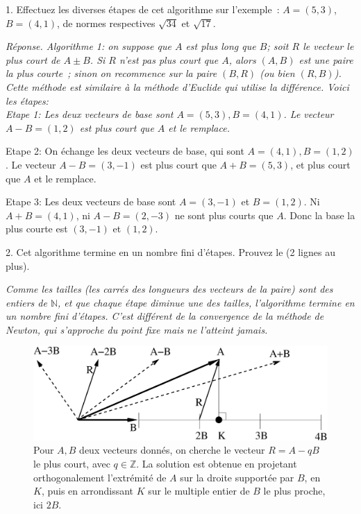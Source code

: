 \documentclass[11pt]{article}
\def\N{\mathbb N}
\def\Z{\mathbb Z}
\begin{document}
{1. Effectuez  les diverses étapes de cet algorithme sur l'exemple~:
$A=(5, 3)$, $B=(4,1)$, de normes respectives $\sqrt{34}$ et $\sqrt{17}$.


{
\ifcorrige

\medskip

{\it Réponse.
Algorithme 1: on suppose que $A$ est plus long que $B$;  soit $R$ le vecteur le plus court de  $A \pm B$. Si $R$ n'est pas plus court que $A$, alors $(A, B)$ est une paire la plus courte~; sinon on recommence sur la paire $(B, R)$ (ou bien $(R, B)$). 
Cette méthode est similaire à la méthode d'Euclide qui utilise la différence.
Voici les étapes:  \\

Etape 1: Les deux vecteurs de base sont $A=(5, 3), B=(4, 1)$. Le vecteur $A-B= (1, 2)$ est plus court que $A$ et le remplace. 

Etape 2: On échange les deux vecteurs de base, qui sont $A=(4, 1), B=(1, 2)$. Le vecteur  $A-B=(3, -1)$
est plus court que $A+B=(5, 3)$, et plus court que $A$ et le remplace.

Etape 3: Les deux vecteurs de base sont $A=(3,-1)$ et $B=(1, 2)$. Ni $A+B=(4,1)$, ni $A-B=(2, -3)$ ne sont plus courts que $A$. Donc la base la plus courte est $(3,-1)$ et $(1, 2)$.


\else
\fi

\medskip

}
}

{
2. Cet algorithme termine en un nombre fini d'étapes. Prouvez le (2 lignes au plus). 

{
\ifcorrige
\medskip

{\it Comme les tailles (les carrés des longueurs des vecteurs de la paire) sont des entiers de $\N$, et que chaque étape
diminue une des tailles, l'algorithme termine en un nombre fini d'étapes.
C'est différent de la convergence de la méthode de Newton, qui s'approche du point fixe mais ne l'atteint jamais.
}

\else
\fi
\medskip

}
}
{
\begin{figure}
\begin{center}
\includegraphics[width=0.8\linewidth]{porgo.eps}
\end{center}
\caption{\label{portho} Pour $A, B$ deux vecteurs donnés, on cherche le vecteur $R=A-qB$ le plus court, avec $q\in\Z$. La solution est obtenue en projetant orthogonalement l'extrémité de $A$ sur la droite supportée par $B$, en $K$,
puis en  arrondissant $K$ sur le  multiple entier de $B$ le plus proche, ici $2B$.}
\end{figure}
}

}
\end{document}
